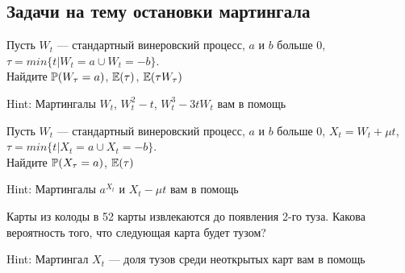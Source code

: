 \subsection{Задачи на тему остановки мартингала}

\begin{problem}
Пусть $W_{t}$ — стандартный винеровский процесс, $a$ и $b$ больше 0, $\tau=min\{t|W_{t}=a \cup W_{t}=-b\}$. \\
Найдите $\P(W_{\tau}=a)$, $\E(\tau)$, $\E(\tau W_{\tau})$

\begin{sol}

Hint: Мартингалы $W_{t}$, $W_{t}^2-t$, $W_{t}^{3}-3tW_{t}$ вам в помощь
\end{sol}
\end{problem}

\begin{problem}
Пусть $W_{t}$ — стандартный винеровский процесс, $a$ и $b$ больше 0, $X_{t}=W_{t}+\mu t$, $\tau=min\{t|X_{t}=a \cup X_{t}=-b\}$. \\
Найдите $\P(X_{\tau}=a)$, $\E(\tau)$

\begin{sol}

Hint: Мартингалы $a^{X_{t}}$ и $X_{t}-\mu t$ вам в помощь
\end{sol}
\end{problem}

\begin{problem}
Карты из колоды в 52 карты извлекаются до появления 2-го туза. Какова вероятность того, что следующая карта будет тузом?

\begin{sol}

Hint: Мартингал $X_{t}$ — доля тузов среди неоткрытых карт вам в помощь
\end{sol}
\end{problem}

